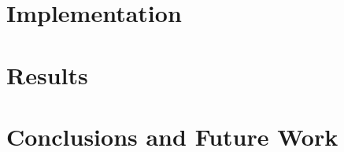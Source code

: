 \documentclass[journal]{vgtc}                %
\begin{document}
\section{Implementation}
 

\section{Results}



\section{Conclusions and Future Work}




\end{document}
